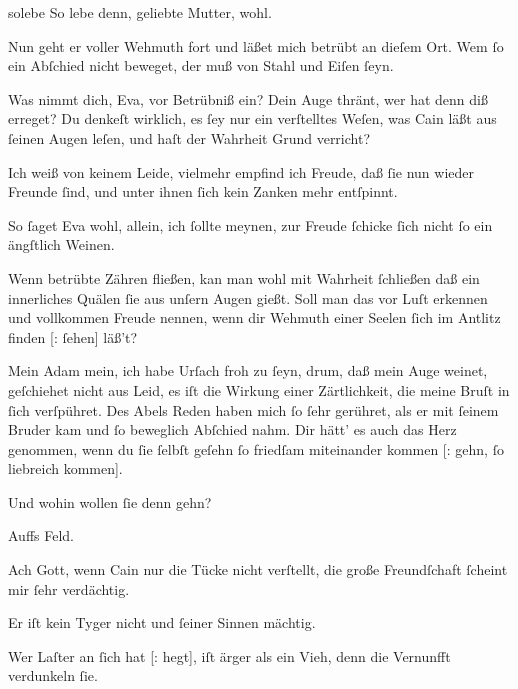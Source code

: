 \documentclass[tocstyle=ref-genre]{ees}
\begin{document}
{\begin{movement}{solebe}
  \voice[Abel]
  So lebe denn, geliebte Mutter, wohl.

  \voice[Eva]
  Nun geht er voller Wehmuth fort
  und läßet mich betrübt an dieſem Ort.
  Wem ſo ein Abſchied nicht beweget,
  der muß von Stahl und Eiſen ſeyn.

  \voice[Adam]
  Was nimmt dich, Eva, vor Betrübniß ein?
  Dein Auge thränt, wer hat denn diß erreget?
  Du denkeſt wirklich,
  es ſey nur ein verſtelltes Weſen,
  was Cain läßt aus ſeinen Augen leſen,
  und haſt der Wahrheit Grund verricht?

  \voice[Eva]
  Ich weiß von keinem Leide,
  vielmehr empfind ich Freude,
  daß ſie nun wieder Freunde ſind,
  und unter ihnen ſich kein Zanken mehr entſpinnt.

  \voice[Adam]
  So ſaget Eva wohl, allein, ich ſollte meynen,
  zur Freude ſchicke ſich nicht ſo ein ängſtlich Weinen.
\end{movement}

\begin{movement}{}
  \voice[Adam]
  Wenn betrübte Zähren fließen,
  kan man wohl mit Wahrheit ſchließen
  daß ein innerliches Quälen
  ſie aus unſern Augen gießt.
  Soll man das vor Luſt erkennen
  und vollkommen Freude nennen,
  wenn dir Wehmuth einer Seelen
  ſich im Antlitz finden [: ſehen] läß’t?
\end{movement}

\begin{movement}{}
  \voice[Eva]
  Mein Adam mein,
  ich habe Urſach froh zu ſeyn,
  drum, daß mein Auge weinet,
  geſchiehet nicht aus Leid,
  es iſt die Wirkung einer Zärtlichkeit,
  die meine Bruſt in ſich verſpühret.
  Des Abels Reden haben mich ſo ſehr gerühret,
  als er mit ſeinem Bruder kam
  und ſo beweglich Abſchied nahm.
  Dir hätt’ es auch das Herz genommen,
  wenn du ſie ſelbſt geſehn
  ſo friedſam miteinander kommen [: gehn, ſo liebreich kommen].

  \voice[Adam]
  Und wohin wollen ſie denn gehn?

  \voice[Eva]
  Auffs Feld.

  \voice[Adam]
  Ach Gott, wenn Cain nur die Tücke nicht verſtellt,
  die große Freundſchaft ſcheint mir ſehr verdächtig.

  \voice[Eva]
  Er iſt kein Tyger nicht und ſeiner Sinnen mächtig.

  \voice[Adam]
  Wer Laſter an ſich hat [: hegt], iſt ärger als ein Vieh,
  denn die Vernunfft verdunkeln ſie.


\end{movement}}
\end{document}
